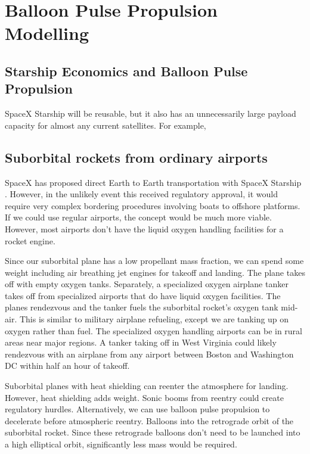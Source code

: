\documentclass{article}
\begin{document}
\section{Balloon Pulse Propulsion Modelling}
\label{sec:pulse_modelling}
\subsection{Starship Economics and Balloon Pulse Propulsion}
SpaceX Starship will be reusable, but it also has an unnecessarily large payload capacity for almost any current satellites.   For example, 




\subsection{Suborbital rockets from ordinary airports}\label{sec:suborbital_airports}
SpaceX has proposed direct Earth to Earth transportation with SpaceX Starship \cite{spacex_earth_earth}.   However, in the unlikely event this received regulatory approval, it would require very complex bordering procedures involving boats to offshore platforms.   If we could use regular airports, the concept would be much more viable.    However, most airports don't have the liquid oxygen handling facilities for a rocket engine.

Since our suborbital plane has a low propellant mass fraction, we can spend some weight including air breathing jet engines for takeoff and landing.   The plane takes off with empty oxygen tanks.   Separately, a specialized oxygen airplane tanker takes off from specialized airports that do have liquid oxygen facilities.    The planes rendezvous and the tanker fuels the suborbital rocket's oxygen tank mid-air.   This is similar to military airplane refueling, except we are tanking up on oxygen rather than fuel.   The specialized oxygen handling airports can be in rural areas near major regions.   A tanker taking off in West Virginia could likely rendezvous with an airplane from any airport between Boston and Washington DC within half an hour of takeoff.   

Suborbital planes with heat shielding can reenter the atmosphere for landing.   However, heat shielding adds weight.   Sonic booms from reentry could create regulatory hurdles.   Alternatively, we can use balloon pulse propulsion to decelerate before atmospheric reentry.   Balloons into the retrograde orbit of the suborbital rocket.   Since these retrograde balloons don't need to be launched into a high elliptical orbit, significantly less mass would be required.
\end{document}
